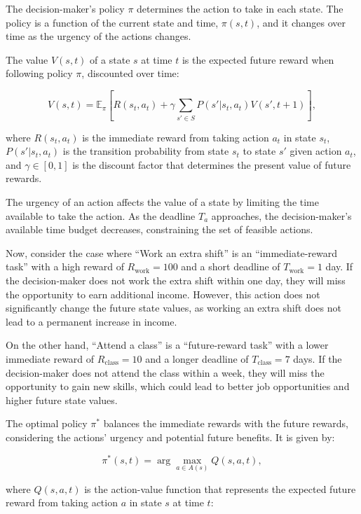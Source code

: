\documentclass[
]{article}
\begin{document}
The decision-maker's policy \(\pi\) determines the action to take in
each state. The policy is a function of the current state and time,
\(\pi(s, t)\), and it changes over time as the urgency of the actions
changes.

The value \(V(s, t)\) of a state \(s\) at time \(t\) is the expected
future reward when following policy \(\pi\), discounted over time:

\[V(s, t) = \mathbb{E}_{\pi}\left[R(s_t, a_t) + \gamma \sum_{s' \in S} P(s' | s_t, a_t) V(s', t+1)\right],\]

where \(R(s_t, a_t)\) is the immediate reward from taking action \(a_t\)
in state \(s_t\), \(P(s' | s_t, a_t)\) is the transition probability
from state \(s_t\) to state \(s'\) given action \(a_t\), and
\(\gamma \in [0, 1]\) is the discount factor that determines the present
value of future rewards.

The urgency of an action affects the value of a state by limiting the
time available to take the action. As the deadline \(T_a\) approaches,
the decision-maker's available time budget decreases, constraining the
set of feasible actions.

Now, consider the case where ``Work an extra shift'' is an
``immediate-reward task'' with a high reward of
\(R_{\text{work}} = 100\) and a short deadline of
\(T_{\text{work}} = 1\) day. If the decision-maker does not work the
extra shift within one day, they will miss the opportunity to earn
additional income. However, this action does not significantly change
the future state values, as working an extra shift does not lead to a
permanent increase in income.

On the other hand, ``Attend a class'' is a ``future-reward task'' with a
lower immediate reward of \(R_{\text{class}} = 10\) and a longer
deadline of \(T_{\text{class}} = 7\) days. If the decision-maker does
not attend the class within a week, they will miss the opportunity to
gain new skills, which could lead to better job opportunities and higher
future state values.

The optimal policy \(\pi^*\) balances the immediate rewards with the
future rewards, considering the actions' urgency and potential future
benefits. It is given by:

\[\pi^*(s, t) = \arg\max_{a \in A(s)} Q(s, a, t),\]

where \(Q(s, a, t)\) is the action-value function that represents the
expected future reward from taking action \(a\) in state \(s\) at time
\(t\):
\end{document}

